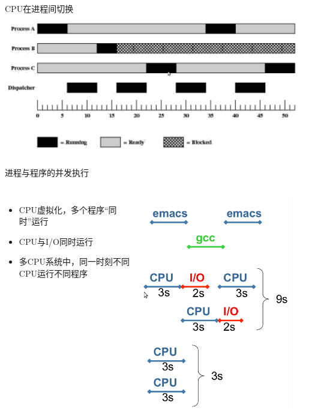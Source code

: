 \documentclass[xcolor=svgnames]{beamer}
\begin{document}
\begin{CJK*}{UTF8}{gbsn}
\begin{frame}{CPU在进程间切换}
\includegraphics[width=1.0\textwidth]{dispatcher.png}
\end{frame}

\begin{frame}{进程与程序的并发执行}
\begin{columns}%
\begin{itemize}
\item CPU虚拟化，多个程序“同时”运行
\item CPU与I/O同时运行
\item 多CPU系统中，同一时刻不同CPU运行不同程序
\end{itemize}
\includegraphics[width=0.9\textwidth]{parallel.png}
\end{columns}%
\end{frame}


\end{CJK*}
\end{document}
